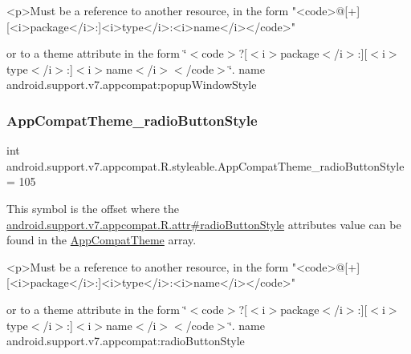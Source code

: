 \begin{DoxyVerb}      <p>Must be a reference to another resource, in the form "<code>@[+][<i>package</i>:]<i>type</i>:<i>name</i></code>"
\end{DoxyVerb}
 or to a theme attribute in the form \char`\"{}$<$code$>$?\mbox{[}$<$i$>$package$<$/i$>$\+:\mbox{]}\mbox{[}$<$i$>$type$<$/i$>$\+:\mbox{]}$<$i$>$name$<$/i$>$$<$/code$>$\char`\"{}.  name android.\+support.\+v7.\+appcompat\+:popup\+Window\+Style \mbox{\label{classandroid_1_1support_1_1v7_1_1appcompat_1_1R_1_1styleable_a32deb732b0bc3a329b727aef8b0c20d7}} 
\subsubsection{\texorpdfstring{App\+Compat\+Theme\+\_\+radio\+Button\+Style}{AppCompatTheme\_radioButtonStyle}}
{\footnotesize\ttfamily int android.\+support.\+v7.\+appcompat.\+R.\+styleable.\+App\+Compat\+Theme\+\_\+radio\+Button\+Style = 105\hspace{0.3cm}{\ttfamily [static]}}

This symbol is the offset where the \hyperlink{classandroid_1_1support_1_1v7_1_1appcompat_1_1R_1_1attr_a39f3d965b1f9c2b0ccff53d00870df43}{android.\+support.\+v7.\+appcompat.\+R.\+attr\#radio\+Button\+Style} attribute\textquotesingle{}s value can be found in the \hyperlink{classandroid_1_1support_1_1v7_1_1appcompat_1_1R_1_1styleable_a5c42f89e8a410c323be34208d75c430b}{App\+Compat\+Theme} array.

\begin{DoxyVerb}      <p>Must be a reference to another resource, in the form "<code>@[+][<i>package</i>:]<i>type</i>:<i>name</i></code>"
\end{DoxyVerb}
 or to a theme attribute in the form \char`\"{}$<$code$>$?\mbox{[}$<$i$>$package$<$/i$>$\+:\mbox{]}\mbox{[}$<$i$>$type$<$/i$>$\+:\mbox{]}$<$i$>$name$<$/i$>$$<$/code$>$\char`\"{}.  name android.\+support.\+v7.\+appcompat\+:radio\+Button\+Style \mbox{\label{classandroid_1_1support_1_1v7_1_1appcompat_1_1R_1_1styleable_a3252c016d788ccf2df296402f41db160}} 
